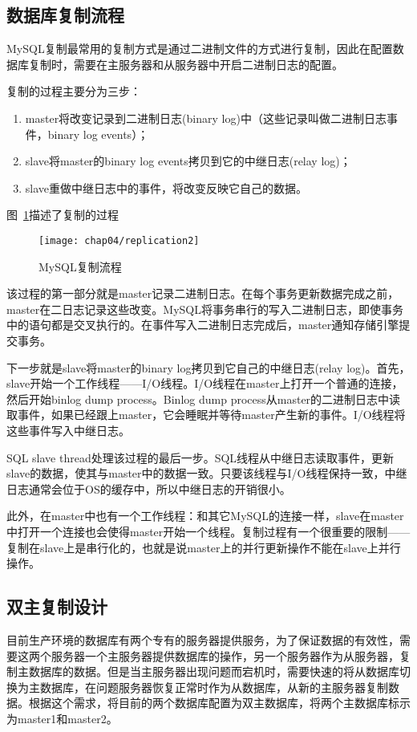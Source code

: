 \subsection{数据库复制流程}
MySQL复制最常用的复制方式是通过二进制文件的方式进行复制，因此在配置数据库复制时，需要在主服务器和从服务器中开启二进制日志的配置。

复制的过程主要分为三步：
\begin{enumerate}
\item master将改变记录到二进制日志(binary log)中（这些记录叫做二进制日志事件，binary log events）；
\item slave将master的binary log events拷贝到它的中继日志(relay log)；
\item slave重做中继日志中的事件，将改变反映它自己的数据。
\end{enumerate}
图~\ref{fig:replication2}描述了复制的过程
\begin{figure}[H] %
  \centering
  \texttt{[image: chap04/replication2]}
  \caption{MySQL复制流程}
  \label{fig:replication2}
\end{figure}
该过程的第一部分就是master记录二进制日志。在每个事务更新数据完成之前，master在二日志记录这些改变。MySQL将事务串行的写入二进制日志，即使事务中的语句都是交叉执行的。在事件写入二进制日志完成后，master通知存储引擎提交事务。

下一步就是slave将master的binary log拷贝到它自己的中继日志(relay log)。首先，slave开始一个工作线程——I/O线程。I/O线程在master上打开一个普通的连接，然后开始binlog dump process。Binlog dump process从master的二进制日志中读取事件，如果已经跟上master，它会睡眠并等待master产生新的事件。I/O线程将这些事件写入中继日志。

SQL slave thread处理该过程的最后一步。SQL线程从中继日志读取事件，更新slave的数据，使其与master中的数据一致。只要该线程与I/O线程保持一致，中继日志通常会位于OS的缓存中，所以中继日志的开销很小。

此外，在master中也有一个工作线程：和其它MySQL的连接一样，slave在master中打开一个连接也会使得master开始一个线程。复制过程有一个很重要的限制——复制在slave上是串行化的，也就是说master上的并行更新操作不能在slave上并行操作。

\subsection{双主复制设计}
目前生产环境的数据库有两个专有的服务器提供服务，为了保证数据的有效性，需要这两个服务器一个主服务器提供数据库的操作，另一个服务器作为从服务器，复制主数据库的数据。但是当主服务器出现问题而宕机时，需要快速的将从数据库切换为主数据库，在问题服务器恢复正常时作为从数据库，从新的主服务器复制数据。根据这个需求，将目前的两个数据库配置为双主数据库，将两个主数据库标示为master1和master2。

